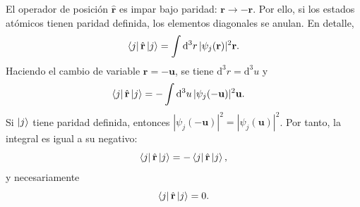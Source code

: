 \documentclass[11pt]{article}
\newcommand{\dd}{\mathrm{d}}
\newcommand{\vb}[1]{\mathbf{#1}}
\begin{document}
El operador de posici\'on \(\hat{\vb r}\) es impar bajo paridad:
\(\vb r\to-\vb r\). Por ello, si los estados at\'omicos tienen paridad definida,
los elementos diagonales se anulan. En detalle,
\begin{equation}
  \bra j\hat{\vb r}\ket j
  =
  \int \dd^3r\,
  |\psi_j(\vb r)|^2\vb r.
\end{equation}
Haciendo el cambio de variable \(\vb r=-\vb u\), se tiene
\(\dd^3r=\dd^3u\) y
\begin{align}
  \bra j\hat{\vb r}\ket j
  &=
  -\int \dd^3u\,
  |\psi_j(-\vb u)|^2\vb u.
\end{align}
Si \(\ket j\) tiene paridad definida, entonces
\(|\psi_j(-\vb u)|^2=|\psi_j(\vb u)|^2\). Por tanto, la integral es igual a su
negativo:
\begin{equation}
  \bra j\hat{\vb r}\ket j
  =
  -\bra j\hat{\vb r}\ket j,
\end{equation}
y necesariamente
\begin{equation}
  \bra j\hat{\vb r}\ket j=0.
\end{equation}
\end{document}

